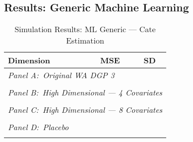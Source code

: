 \documentclass[11pt, a4paper, leqno]{article}
\begin{document}
\subsection{Results: Generic Machine Learning}


\begin{table}
    \caption{Simulation Results: ML Generic --- Cate Estimation}
    \center
    \begin{tabular}{lcc}
        Dimension & MSE & SD \\
        \toprule
        \multicolumn{3}{l}{\textit{Panel A:\ Original WA DGP 3}} \\
         \\
        \midrule

        \multicolumn{3}{l}{\textit{Panel B:\ High Dimensional --- 4 Covariates}} \\
         \\
        \midrule

        \multicolumn{3}{l}{\textit{Panel C:\ High Dimensional --- 8 Covariates}} \\
         \\
        \midrule

        \multicolumn{3}{l}{\textit{Panel D:\ Placebo}} \\
         \\
        \bottomrule
    \end{tabular}

\end{table}
\end{document}
